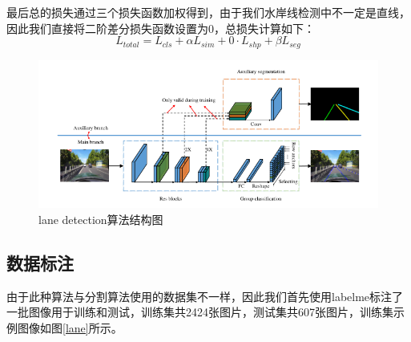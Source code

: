 \documentclass[cn,12pt,color=mine,scheme=chinese,bibstyle=gb7714-2015]{elegantbook}
\begin{document}
最后总的损失通过三个损失函数加权得到，由于我们水岸线检测中不一定是直线，因此我们直接将二阶差分损失函数设置为0，总损失计算如下：
\begin{equation}
	L_{total}=L_{cls}+\alpha L_{sim}+0\cdot L_{shp}+\beta L_{seg}
\end{equation}

\begin{figure}[h]
	\centering
	\includegraphics[width=.95\linewidth]{images/lane2}
	\caption{lane detection算法结构图}
	\label{lane2}
\end{figure}

\subsection{数据标注}
由于此种算法与分割算法使用的数据集不一样，因此我们首先使用labelme\cite{labelme2016}标注了一批图像用于训练和测试，训练集共2424张图片，测试集共607张图片，训练集示例图像如图\ref{lane}所示。
\end{document}
